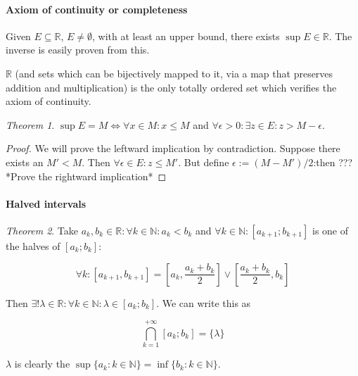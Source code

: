 \documentclass[12pt,a4paper]{report}
\numberwithin{equation}{section}
\theoremstyle{definition}
\theoremstyle{remark}
\newtheorem{theorem}{Theorem}[section]
\begin{document}
\paragraph{Axiom of continuity or completeness} Given $E \subseteq \mathbb{R}$, $E\neq\emptyset$, with at least an upper bound, there exists $\sup E \in \mathbb{R}$. The inverse is easily proven from this.

$\mathbb{R}$ (and sets which can be bijectively mapped to it, via a map that preserves addition and multiplication) is the only totally ordered set which verifies the axiom of continuity.

\begin{theorem}
$\sup E = M \iff \forall x \in M: x \leq M$ and $\forall \epsilon > 0: \exists z \in E : z>M-\epsilon$.
\end{theorem}

\begin{proof}
We will prove the leftward implication by contradiction. Suppose there exists an $M'<M$. Then $\forall \epsilon \in E: z \leq M'$. But define $\epsilon := (M-M')/2$:then ???
*Prove the rightward implication*
\end{proof}

\paragraph{Halved intervals}

\begin{theorem}
Take $a_k, b_k \in \mathbb{R}: \forall k \in \mathbb{N}: a_k < b_k$ and $\forall k \in \mathbb{N}: [a_{k+1}; b_{k+1}]$ is one of the halves of $[a_k; b_k]$:

\begin{equation}
\forall k: [a_{k+1}, b_{k+1}] = \left[a_k, \frac{a_k + b_k}{2}\right] \vee \left[\frac{a_k + b_k}{2}, b_k\right]
\end{equation}

Then $\exists ! \lambda \in \mathbb{R}: \forall k \in \mathbb{N}: \lambda \in [a_k; b_k]$. We can write this as

\begin{equation}
\bigcap_{k=1}^{+\infty} [a_k; b_k] = \lbrace \lambda \rbrace
\end{equation}

$\lambda$ is clearly the $\sup \lbrace a_k: k \in \mathbb{N}\rbrace = \inf \lbrace b_k: k \in \mathbb{N}\rbrace$.
\end{theorem}
\end{document}

